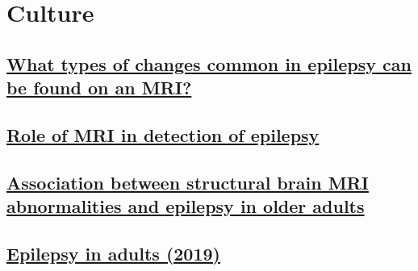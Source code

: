 \chapter{Culture}

\section{\href{https://www.epilepsy.com/diagnosis/brain-imaging/mri}{What types of changes common in epilepsy can be found on an MRI?}}

\section{\href{https://radiologyassistant.nl/neuroradiology/epilepsy/role-of-mri}{Role of MRI in detection of epilepsy}}

\section{\href{https://pubmed.ncbi.nlm.nih.gov/38155477/}{Association between structural brain MRI abnormalities and epilepsy in older adults}}

\section{\href{https://www.sciencedirect.com/science/article/abs/pii/S0140673618325960}{Epilepsy in adults (2019)}}

